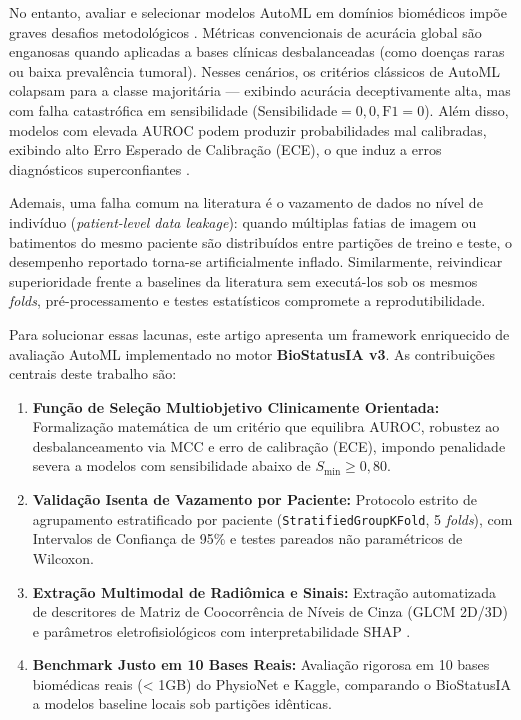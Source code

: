 \documentclass[conference]{IEEEtran}
\begin{document}
No entanto, avaliar e selecionar modelos AutoML em domínios biomédicos impõe graves desafios metodológicos \cite{santos2023multi, singh2024metric}. Métricas convencionais de acurácia global são enganosas quando aplicadas a bases clínicas desbalanceadas (como doenças raras ou baixa prevalência tumoral). Nesses cenários, os critérios clássicos de AutoML colapsam para a classe majoritária — exibindo acurácia deceptivamente alta, mas com falha catastrófica em sensibilidade ($\text{Sensibilidade} = 0{,}0, \text{F1} = 0$). Além disso, modelos com elevada AUROC podem produzir probabilidades mal calibradas, exibindo alto Erro Esperado de Calibração (ECE), o que induz a erros diagnósticos superconfiantes \cite{guo2017calibration, vancalster2019calibration}.

Ademais, uma falha comum na literatura é o vazamento de dados no nível de indivíduo (\textit{patient-level data leakage}): quando múltiplas fatias de imagem ou batimentos do mesmo paciente são distribuídos entre partições de treino e teste, o desempenho reportado torna-se artificialmente inflado. Similarmente, reivindicar superioridade frente a baselines da literatura sem executá-los sob os mesmos \textit{folds}, pré-processamento e testes estatísticos compromete a reprodutibilidade.

Para solucionar essas lacunas, este artigo apresenta um framework enriquecido de avaliação AutoML implementado no motor \textbf{BioStatusIA v3}. As contribuições centrais deste trabalho são:
\begin{enumerate}
    \item \textbf{Função de Seleção Multiobjetivo Clinicamente Orientada:} Formalização matemática de um critério que equilibra AUROC, robustez ao desbalanceamento via MCC \cite{mcc1975} e erro de calibração (ECE), impondo penalidade severa a modelos com sensibilidade abaixo de $S_{\min} \ge 0{,}80$.
    \item \textbf{Validação Isenta de Vazamento por Paciente:} Protocolo estrito de agrupamento estratificado por paciente (\texttt{StratifiedGroupKFold}, 5 \textit{folds}), com Intervalos de Confiança de 95\% e testes pareados não paramétricos de Wilcoxon.
    \item \textbf{Extração Multimodal de Radiômica e Sinais:} Extração automatizada de descritores de Matriz de Coocorrência de Níveis de Cinza (GLCM 2D/3D) \cite{baker2022radiomics, martinez2023predicting} e parâmetros eletrofisiológicos com interpretabilidade SHAP \cite{shap2017}.
    \item \textbf{Benchmark Justo em 10 Bases Reais:} Avaliação rigorosa em 10 bases biomédicas reais (< 1GB) do PhysioNet \cite{physionet2000} e Kaggle, comparando o BioStatusIA a modelos baseline locais sob partições idênticas.
\end{enumerate}
\end{document}
